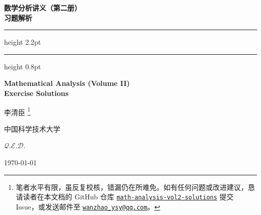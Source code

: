 \thispagestyle{empty}

\begin{center}

    {\fontsize{34pt}{40pt}\selectfont\rmfamily\bfseries\color{ThemeWine}
        数学分析讲义（第二册）\\[0.4em] 习题解析
    }

    \vspace{1.2cm}

    {\color{ThemeWine}\hrule height 2.2pt}
    \vspace{2.5pt}
    {\color{ThemeRose}\hrule height 0.8pt}

    \vspace{1.2cm}

    {\fontsize{18pt}{22pt}\selectfont\rmfamily\bfseries\color{ThemeDarkBlue}
        Mathematical Analysis (Volume II)
    } \\
    \vspace{0.6em}
    {\large\rmfamily\bfseries\color{ThemeDarkBlue} Exercise Solutions}


    {\Large\kaishu\color{ThemeDarkBlue} 李清臣} \footnote{%
        \color{ThemeDarkBlue}\rmfamily
        笔者水平有限，虽反复校核，错漏仍在所难免。如有任何问题或改进建议，恳请读者在本文档的 GitHub 仓库
        \href{https://github.com/wanzhao-ysy/math-analysis-vol2-solutions}{\texttt{math-analysis-vol2-solutions}}
        提交 Issue，或发送邮件至 \href{mailto:wanzhao_ysy@qq.com}{\texttt{wanzhao\_ysy@qq.com}}。
    }

    \vspace{0.5cm}
    {\large\kaishu\color{ThemeMidBlue} 中国科学技术大学}

    \vspace{2cm}

    {\color{ThemeRose}\Large $\mathcal{Q.E.D.}$}

    \vspace{0.8cm}
    {\large\rmfamily\color{ThemeMidBlue}\today}

\end{center}

